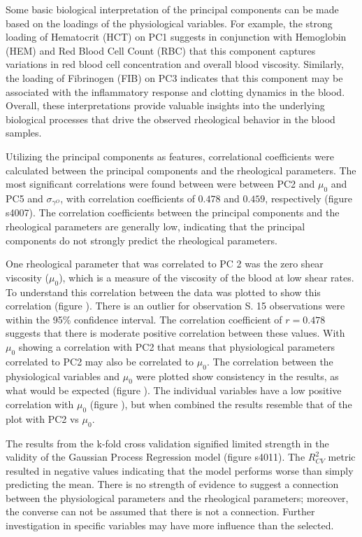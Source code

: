 \documentclass[12pt,letterpaper]{article}
\begin{document}
Some basic biological interpretation of the principal components can be made based on the loadings of the physiological variables. For example, the strong loading of Hematocrit (HCT) on PC1 suggests
in conjunction with Hemoglobin (HEM) and Red Blood Cell Count (RBC) that this component captures variations in red blood cell concentration and overall blood viscosity.
Similarly, the loading of Fibrinogen (FIB) on PC3 indicates that this component may be associated with the inflammatory response and clotting dynamics in the blood. Overall, these interpretations provide
valuable insights into the underlying biological processes that drive the observed rheological behavior in the blood samples.

Utilizing the principal components as features, correlational coefficients were calculated between the principal components and the rheological parameters. The most significant correlations were found between
were between PC2 and $\mu_0$ and PC5 and $\sigma_{\gamma^O}$, with correlation coefficients of $0.478$ and $0.459$, respectively (figure s4007). The correlation coefficients between the principal components
and the rheological parameters are generally low, indicating that the principal components do not strongly predict the rheological parameters.

One rheological parameter that was correlated to PC 2 was the zero shear viscosity ($\mu_0$), which is a measure of the viscosity of the blood at low shear rates. To understand this correlation between the data was plotted to show
this correlation (figure ). There is an outlier for observation S. 15 observations were within the 95\% confidence interval. The correlation coefficient of $r=0.478$ suggests that there is moderate positive correlation between these values.
With $\mu_0$ showing a correlation with PC2 that means that physiological parameters correlated to PC2 may also be correlated to $\mu_0$. The correlation between the physiological variables and $\mu_0$ were plotted show
consistency in the results, as what would be expected (figure ). The individual variables have a low positive correlation with $\mu_0$ (figure ), but when combined the results resemble that of the plot with PC2 vs $\mu_0$.

The results from the k-fold cross validation signified limited strength in the validity of the Gaussian Process Regression model (figure s4011). The $R^2_{CV}$ metric resulted in negative values indicating that the model performs worse
than simply predicting the mean. There is no strength of evidence to suggest a connection between the physiological parameters and the rheological parameters; moreover, the converse can not be assumed that there is not a connection.
Further investigation in specific variables may have more influence than the selected.
\end{document}
